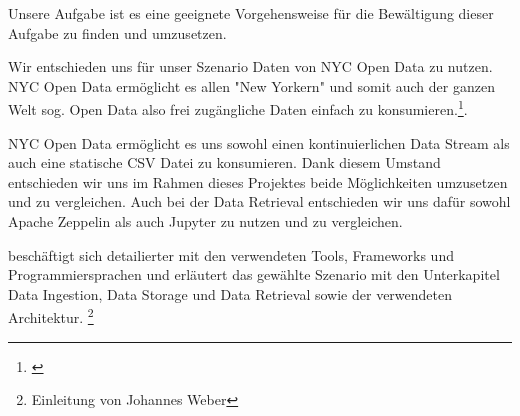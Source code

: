 Unsere Aufgabe ist es eine geeignete Vorgehensweise für die Bewältigung dieser Aufgabe zu finden und umzusetzen.

Wir entschieden uns für unser Szenario Daten von NYC Open Data zu nutzen.
NYC Open Data ermöglicht es allen "New Yorkern" und somit auch der ganzen Welt sog. Open Data also frei zugängliche Daten
einfach zu konsumieren.\footnote{\cite{NYCOpenData}}.

NYC Open Data ermöglicht es uns sowohl einen kontinuierlichen Data Stream als auch eine statische \ac{CSV} Datei zu konsumieren.
Dank diesem Umstand entschieden wir uns im Rahmen dieses Projektes beide Möglichkeiten umzusetzen und zu vergleichen.
Auch bei der Data Retrieval entschieden wir uns dafür sowohl Apache Zeppelin als auch Jupyter zu nutzen und zu vergleichen.

 beschäftigt sich detailierter mit den verwendeten Tools, Frameworks und Programmiersprachen und 
erläutert das gewählte Szenario mit den Unterkapitel Data Ingestion, Data Storage und Data Retrieval sowie der verwendeten Architektur. \footnote{Einleitung von Johannes Weber}

